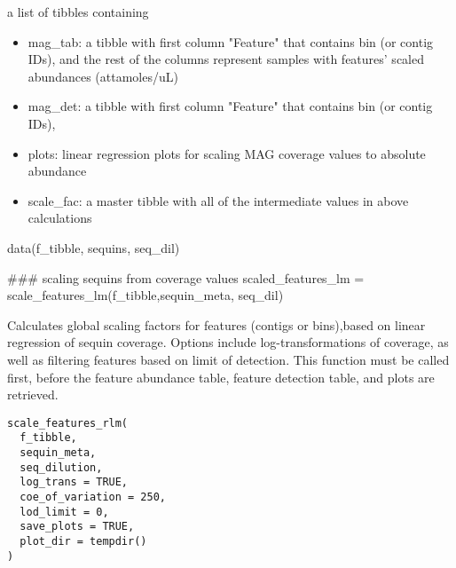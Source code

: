 \documentclass[a4paper]{book}
\begin{document}
%
\begin{Value}
a list of tibbles containing
\begin{itemize}

\item{} mag\_tab: a tibble with first column "Feature" that contains bin (or contig IDs), and the rest of the columns represent samples with features' scaled abundances (attamoles/uL)
\item{} mag\_det: a tibble with first column "Feature" that contains bin (or contig IDs),
\item{} plots: linear regression plots for scaling MAG coverage values to absolute abundance
\item{} scale\_fac: a master tibble with all of the intermediate values in above calculations

\end{itemize}

\end{Value}
%
\begin{Examples}
\begin{ExampleCode}
data(f_tibble, sequins, seq_dil)



### scaling sequins from coverage values
scaled_features_lm = scale_features_lm(f_tibble,sequin_meta, seq_dil)


\end{ExampleCode}
\end{Examples}
%
\begin{Description}\relax
Calculates global scaling factors for features (contigs or bins),based on linear regression of sequin coverage. Options include log-transformations of coverage, as well as filtering features based on limit of detection. This function must be called first, before the feature abundance table, feature detection table, and plots are retrieved.
\end{Description}
%
\begin{Usage}
\begin{verbatim}
scale_features_rlm(
  f_tibble,
  sequin_meta,
  seq_dilution,
  log_trans = TRUE,
  coe_of_variation = 250,
  lod_limit = 0,
  save_plots = TRUE,
  plot_dir = tempdir()
)
\end{verbatim}
\end{Usage}
%
\end{document}
